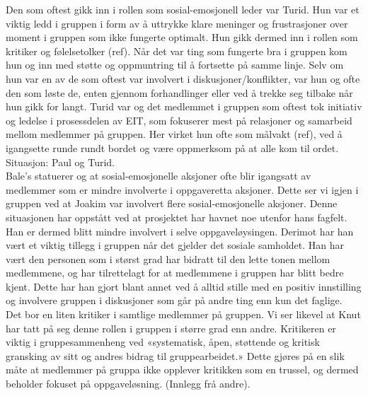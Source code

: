 Den som oftest gikk inn i rollen som sosial-emosjonell leder var Turid. Hun var et viktig 
ledd i gruppen i form av å uttrykke klare meninger og frustrasjoner over moment i gruppen
som ikke fungerte optimalt. Hun gikk dermed inn i rollen som kritiker og følelsetolker (ref).
Når det var ting som fungerte bra i gruppen kom hun og inn med støtte og oppmuntring til å 
fortsette på samme linje. Selv om hun var en av de som oftest var involvert i diskusjoner/konflikter,
var hun og ofte den som løste de, enten gjennom forhandlinger eller ved å trekke seg tilbake
når hun gikk for langt. Turid var og det medlemmet i gruppen som oftest tok initiativ og ledelse 
i prosessdelen av EIT, som fokuserer mest på relasjoner og samarbeid mellom medlemmer på gruppen. 
Her virket hun ofte som målvakt (ref), ved å igangsette runde rundt bordet og være oppmerksom på 
at alle kom til ordet.
Situasjon: Paul og Turid.\\

Bale's statuerer og at sosial-emosjonelle aksjoner ofte blir igangsatt av medlemmer som er 
mindre involverte i oppgaveretta aksjoner. Dette ser vi igjen i gruppen ved at Joakim var 
involvert flere sosial-emosjonelle aksjoner. Denne situasjonen har oppstått ved at prosjektet 
har havnet noe utenfor hans fagfelt. Han er dermed blitt mindre involvert i selve oppgaveløysingen. 
Derimot har han vært et viktig tillegg i gruppen når det gjelder det sosiale samholdet. 
Han har vært den personen som i størst grad har bidratt til den lette tonen mellom medlemmene, 
og har tilrettelagt for at medlemmene i gruppen har blitt bedre kjent. Dette har han gjort 
blant annet ved å alltid stille med en positiv innstilling og involvere gruppen i diskusjoner 
som går på andre ting enn kun det faglige.\\

Det bor en liten kritiker i samtlige medlemmer på gruppen. Vi ser likevel at Knut har tatt på 
seg denne rollen i gruppen i større grad enn andre. Kritikeren er viktig i gruppesammenheng 
ved «systematisk, åpen, støttende og kritisk gransking av sitt og andres bidrag til gruppearbeidet.»
Dette gjøres på en slik måte at medlemmer på gruppa ikke opplever kritikken som en trussel, 
og dermed beholder fokuset på oppgaveløsning. (Innlegg frå andre).\\

